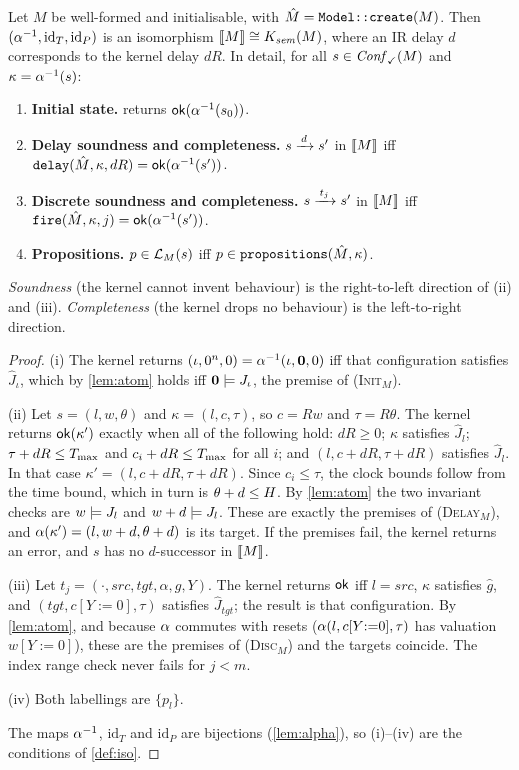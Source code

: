 \begin{theorem}\label{thm:kernel}
Let $M$ be well-formed and initialisable, with $\hat M=\texttt{Model::create}(M)$.
Then $(\alpha^{-1},\mathrm{id}_T,\mathrm{id}_P)$ is an isomorphism
$\llbracket M \rrbracket\cong K_{\mathit{sem}}(M)$, where an IR delay $d$ corresponds to the kernel delay $dR$.
In detail, for all $s\in\mathit{Conf}_{\checkmark}(M)$ and $\kappa=\alpha^{-1}(s)$:
\begin{enumerate}[label=(\roman*)]
\item \textbf{Initial state.}  returns $\mathsf{ok}(\alpha^{-1}(s_0))$.
\item \textbf{Delay soundness and completeness.} $s\xrightarrow{\,d\,}s'$ in $\llbracket M \rrbracket$ iff
  $\texttt{delay}(\hat M,\kappa,dR)=\mathsf{ok}(\alpha^{-1}(s'))$.
\item \textbf{Discrete soundness and completeness.} $s\xrightarrow{\,t_j\,}s'$ in $\llbracket M \rrbracket$ iff
  $\texttt{fire}(\hat M,\kappa,j)=\mathsf{ok}(\alpha^{-1}(s'))$.
\item \textbf{Propositions.} $p\in\mathcal{L}_M(s)$ iff $p\in\texttt{propositions}(\hat M,\kappa)$.
\end{enumerate}
\emph{Soundness} (the kernel cannot invent behaviour) is the right-to-left direction
of (ii) and (iii). \emph{Completeness} (the kernel drops no behaviour) is the
left-to-right direction.
\end{theorem}
\begin{proof}
(i) The kernel returns $(\iota,0^n,0)=\alpha^{-1}(\iota,\mathbf{0},0)$ iff that configuration
satisfies $\hat J_\iota$, which by \cref{lem:atom} holds iff $\mathbf{0}\models J_\iota$, the
premise of \textsc{(Init$_M$)}.

(ii) Let $s=(l,w,\theta)$ and $\kappa=(l,c,\tau)$, so $c=Rw$ and $\tau=R\theta$. The kernel
returns $\mathsf{ok}(\kappa')$ exactly when all of the following hold: $dR\ge0$; $\kappa$
satisfies $\hat J_l$; $\tau+dR\le T_{\max}$ and $c_i+dR\le T_{\max}$ for all $i$; and
$(l,c+dR,\tau+dR)$ satisfies $\hat J_l$. In that case $\kappa'=(l,c+dR,\tau+dR)$. Since
$c_i\le\tau$, the clock bounds follow from the time bound, which in turn is
$\theta+d\le H$. By \cref{lem:atom} the two invariant checks are $w\models J_l$ and
$w+d\models J_l$. These are exactly the premises of \textsc{(Delay$_M$)}, and
$\alpha(\kappa')=(l,w+d,\theta+d)$ is its target. If the premises fail, the kernel returns
an error, and $s$ has no $d$-successor in $\llbracket M \rrbracket$.

(iii) Let $t_j=(\cdot,\mathit{src},\mathit{tgt},\alpha,g,Y)$. The kernel returns $\mathsf{ok}$ iff
$l=\mathit{src}$, $\kappa$ satisfies $\hat g$, and $(\mathit{tgt},c[Y{:=}0],\tau)$ satisfies
$\hat J_{\mathit{tgt}}$; the result is that configuration. By \cref{lem:atom}, and
because $\alpha$ commutes with resets ($\alpha(l,c[Y{:=}0],\tau)$ has valuation $w[Y{:=}0]$),
these are the premises of \textsc{(Disc$_M$)} and the targets coincide. The index
range check never fails for $j<m$.

(iv) Both labellings are $\{p_l\}$.

The maps $\alpha^{-1}$, $\mathrm{id}_T$ and $\mathrm{id}_P$ are bijections
(\cref{lem:alpha}), so (i)--(iv) are the conditions of \cref{def:iso}.
\end{proof}

